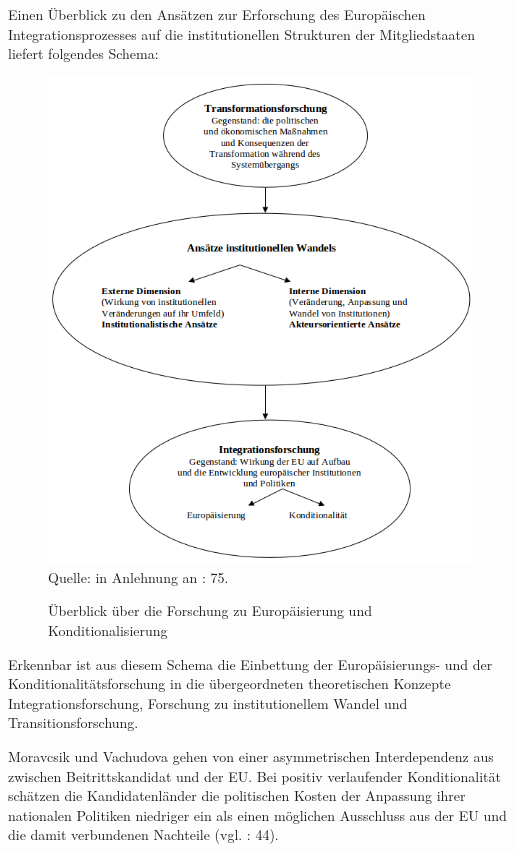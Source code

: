 Einen Überblick zu den Ansätzen zur Erforschung des Europäischen Integrationsprozesses auf die institutionellen Strukturen der Mitgliedstaaten liefert folgendes Schema:
\begin{figure}[H]
\setlength\belowcaptionskip{10pt}
 \centering
\caption{ Überblick über die Forschung zu Europäisierung und Konditionalisierung}
 
  \includegraphics[width=5in]{Material/ForschungZuEuropUndKondi_ohneRand}\\

Quelle: in Anlehnung an \cite{huszak} : 75.
  \end{figure}
Erkennbar ist aus diesem Schema die Einbettung der Europäisierungs- und der Konditionalitätsforschung in die übergeordneten theoretischen Konzepte Integrationsforschung, Forschung zu institutionellem Wandel und Transitionsforschung.\par
Moravcsik und Vachudova gehen von einer asymmetrischen Interdependenz aus zwischen Beitrittskandidat und der EU. Bei positiv verlaufender Konditionalität schätzen die Kandidatenländer die politischen Kosten der Anpassung ihrer nationalen Politiken niedriger ein als einen möglichen Ausschluss aus der EU und die damit verbundenen Nachteile (vgl. \cite{morvac} : 44).
